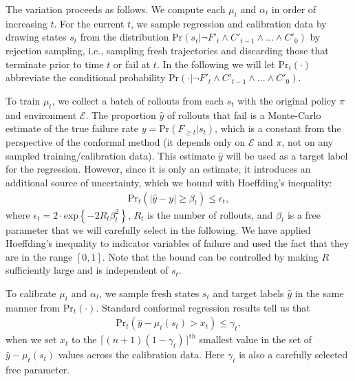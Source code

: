 \documentclass[12pt,letterpaper]{article}
\begin{document}
The variation proceeds as follows.  We compute each $\mu_t$ and $\alpha_t$ in order of increasing $t$.  For the current $t$, we sample regression and calibration data by drawing states $s_t$ from the distribution $\text{Pr}(s_t | \neg F'_t\wedge  C'_{t-1}\wedge ... \wedge C'_0)$ by rejection sampling, i.e., sampling fresh trajectories and discarding those that terminate prior to time $t$ or fail at $t$.  In the following we will let $\text{Pr}_t(\cdot)$ abbreviate the conditional probability $\text{Pr}(\cdot|\neg F'_t\wedge  C'_{t-1}\wedge ... \wedge C'_0)$.

To train $\mu_t$, we collect a batch of rollouts from each $s_t$ with the original policy $\pi$ and environment $\mathcal{E}$.  The proportion $\hat{y}$ of rollouts that fail is a Monte-Carlo estimate of the true failure rate $y = \text{Pr}(F_{\geq t}|s_t)$, which is a constant from the perspective of the conformal method (it depends only on $\mathcal{E}$ and $\pi$, not on any sampled training/calibration data).  This estimate $\hat{y}$ will be used as a target label for the regression.  However, since it is only an estimate, it introduces an additional source of uncertainty, which we bound with Hoeffding's inequality:
\begin{align}
\text{Pr}_t(|\hat{y} - y| \geq \beta_t) \leq \epsilon_t,
\end{align}
where $\epsilon_t = 2\cdot\text{exp}\left\{ -2R_t\beta_t^2 \right\}$, $R_t$ is the number of rollouts, and $\beta_t$ is a free parameter that we will carefully select in the following.  We have applied Hoeffding's inequality to indicator variables of failure and used the fact that they are in the range $[0,1]$.  Note that the bound can be controlled by making $R$ sufficiently large and is independent of $s_t$.

To calibrate $\mu_t$ and $\alpha_t$, we sample fresh states $s_t$ and target labels $\hat{y}$ in the same manner from $\text{Pr}_t(\cdot)$.  Standard conformal regression results tell us that
\begin{align}
\text{Pr}_t(\hat{y} - \mu_t(s_t) > x_t) \leq \gamma_t,
\end{align}
when we set $x_t$ to the $\lceil(n+1)(1-\gamma_t)\rceil^\text{th}$ smallest value in the set of $\hat{y} - \mu_t(s_t)$ values across the calibration data.  Here $\gamma_t$ is also a carefully selected free parameter.
\end{document}

